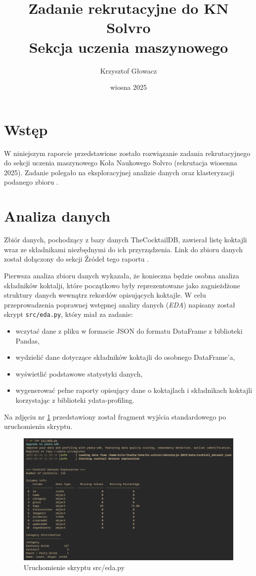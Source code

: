 \documentclass{article}
\title{%
    Zadanie rekrutacyjne do KN Solvro\\
    \large{Sekcja uczenia maszynowego}
}
\author{Krzysztof Głowacz}
\date{wiosna 2025}
\newcommand{\code}[1]{\colorbox{light-gray}{\texttt{#1}}}
\begin{document}
\maketitle
\tableofcontents
\clearpage

\section{Wstęp}
    W niniejszym raporcie przedstawione zostało rozwiązanie zadania rekrutacyjnego do sekcji uczenia maszynowego Koła Naukowego Solvro (rekrutacja wiosenna 2025). Zadanie polegało na eksploracyjnej analizie danych oraz klasteryzacji podanego zbioru \cite{instrukcja}.

\section{Analiza danych}
    Zbiór danych, pochodzący z bazy danych TheCocktailDB, zawierał listę koktajli wraz ze składnikami niezbędnymi do ich przyrządzenia. Link do zbioru danych został dołączony do sekcji Źródeł tego raportu \cite{zbior_danych}.

    Pierwsza analiza zbioru danych wykazała, że konieczna będzie osobna analiza składników koktalji, które początkowo były reprezentowane jako zagnieżdżone struktury danych wewnątrz rekordów opisujących koktajle. W celu przeprowadzenia poprawnej wstępnej analizy danych (\textit{EDA}) napisany został skrypt \code{src/eda.py}, który miał za zadanie:
    \begin{itemize}
        \item wczytać dane z pliku w formacie JSON do formatu DataFrame z biblioteki Pandas,
        \item wydzielić dane dotyczące składników koktajli do osobnego DataFrame'a,
        \item wyświetlić podstawowe statystyki danych,
        \item wygenerować pełne raporty opisujący dane o koktajlach i składnikach koktajli korzystając z biblioteki ydata-profiling.
    \end{itemize}
    Na zdjęciu nr \ref{fig:run_eda} przedstawiony został fragment wyjścia standardowego po uruchomieniu skryptu.

    \begin{figure}[!htbp]%
        \centering
        \includegraphics[width=\textwidth]{eda_run.png}
        \caption{Uruchomienie skryptu src/eda.py}%
        \label{fig:run_eda}
    \end{figure}
\end{document}

